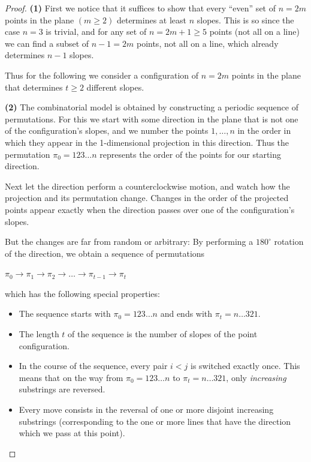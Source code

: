 \documentclass[a4paper]{article}
\begin{document}
\begin{proof}
\textbf{(1)} First we notice that it suffices to show that every “even” set of $n = 2m$ points in the plane $(m \geq 2)$ determines at least $n$ slopes. This is so since the case $n = 3$ is trivial, and for any set of $n = 2m + 1 \geq 5$ points (not all on a line) we can find a subset of $n - 1=2m$ points, not all on a line, which already determines $n - 1$ slopes. 

\noindent
Thus for the following we consider a configuration of $n = 2m$ points in the plane that determines $t \geq 2$ different slopes.


\noindent
\textbf{(2)} The combinatorial model is obtained by constructing a periodic sequence of permutations. For this we start with some direction in the plane that is not one of the configuration’s slopes, and we number the points $1,\ldots,n$ in the order in which they appear in the 1-dimensional projection in this direction. Thus the permutation $\pi_0 = 123 \ldots n$ represents the order of the points for our starting direction.

\noindent
Next let the direction perform a counterclockwise motion, and watch how the projection and its permutation change. Changes in the order of the projected points appear exactly when the direction passes over one of the configuration’s slopes. 

\noindent
But the changes are far from random or arbitrary: By performing a $180^\circ$ rotation of the direction, we obtain a sequence of permutations

\begin{center}
$ \pi_0 \rightarrow \pi_1 \rightarrow \pi_2 \rightarrow \ldots \rightarrow \pi_{t-1} \rightarrow \pi_t $
\end{center}

\noindent
which has the following special properties:

\begin{itemize}
  \item The sequence starts with $\pi_0 = 123 \ldots n$ and ends with $\pi_t = n \ldots 321$.
  \item The length $t$ of the sequence is the number of slopes of the point configuration.
  \item In the course of the sequence, every pair $i < j$ is switched exactly once. This means that on the way from $\pi_0 = 123 \ldots n$ to $\pi_t = n \ldots 321$, only \textit{increasing} substrings are reversed.
  \item Every move consists in the reversal of one or more disjoint increasing substrings (corresponding to the one or more lines that have the direction which we pass at this point).
\end{itemize}


\end{proof}
\end{document}
